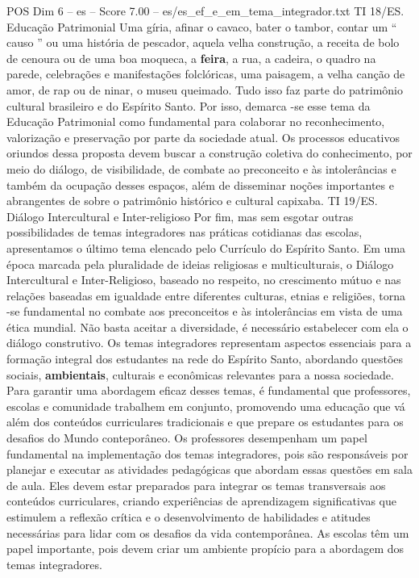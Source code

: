 \begin{textsample}{POS Dim 6 – es – Score 7.00 – es/es\_ef\_e\_em\_tema\_integrador.txt}
TI 18/ES.
Educação Patrimonial Uma gíria, afinar o cavaco, bater o tambor, contar um “ causo ” ou uma história de pescador, aquela velha construção, a receita de bolo de cenoura ou de uma boa moqueca, a \textbf{feira}, a rua, a cadeira, o quadro na parede, celebrações e manifestações folclóricas, uma paisagem, a velha canção de amor, de rap ou de ninar, o museu queimado.
Tudo isso faz parte do patrimônio cultural brasileiro e do Espírito Santo.
Por isso, demarca -se esse tema da Educação Patrimonial como fundamental para colaborar no reconhecimento, valorização e preservação por parte da sociedade atual.
Os processos educativos oriundos dessa proposta devem buscar a construção coletiva do conhecimento, por meio do diálogo, de visibilidade, de combate ao preconceito e às intolerâncias e também da ocupação desses espaços, além de disseminar noções importantes e abrangentes de sobre o patrimônio histórico e cultural capixaba.
TI 19/ES.
Diálogo Intercultural e Inter-religioso Por fim, mas sem esgotar outras possibilidades de temas integradores nas práticas cotidianas das escolas, apresentamos o último tema elencado pelo Currículo do Espírito Santo.
Em uma época marcada pela pluralidade de ideias religiosas e multiculturais, o Diálogo Intercultural e Inter-Religioso, baseado no respeito, no crescimento mútuo e nas relações baseadas em igualdade entre diferentes culturas, etnias e religiões, torna -se fundamental no combate aos preconceitos e às intolerâncias em vista de uma ética mundial.
Não basta aceitar a diversidade, é necessário estabelecer com ela o diálogo construtivo.
Os temas integradores representam aspectos essenciais para a formação integral dos estudantes na rede do Espírito Santo, abordando questões sociais, \textbf{ambientais}, culturais e econômicas relevantes para a nossa sociedade.
Para garantir uma abordagem eficaz desses temas, é fundamental que professores, escolas e comunidade trabalhem em conjunto, promovendo uma educação que vá além dos conteúdos curriculares tradicionais e que prepare os estudantes para os desafios do Mundo conteporâneo.
Os professores desempenham um papel fundamental na implementação dos temas integradores, pois são responsáveis por planejar e executar as atividades pedagógicas que abordam essas questões em sala de aula.
Eles devem estar preparados para integrar os temas transversais aos conteúdos curriculares, criando experiências de aprendizagem significativas que estimulem a reflexão crítica e o desenvolvimento de habilidades e atitudes necessárias para lidar com os desafios da vida contemporânea.
As escolas têm um papel importante, pois devem criar um ambiente propício para a abordagem dos temas integradores.

\end{textsample}
